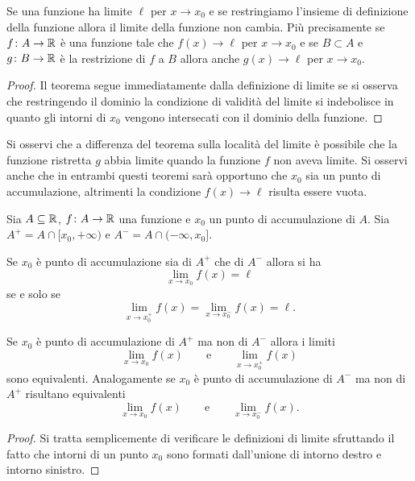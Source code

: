 \begin{theorem}
Se una funzione ha limite $\ell$ per $x\to x_0$ 
e se restringiamo l'insieme di definizione della funzione 
allora il limite della funzione non cambia. 
Più precisamente
se $f\colon A \to \mathbb R$ è una funzione tale che $f(x)\to \ell$ per $x\to x_0$
e se $B \subset A$ e $g\colon B\to \mathbb R$ è la restrizione di $f$ 
a $B$ allora anche $g(x)\to \ell$ per $x\to x_0$. 
\end{theorem}
%
\begin{proof}
Il teorema segue immediatamente dalla definizione di limite se si osserva
che restringendo il dominio la condizione di validità del limite si indebolisce
in quanto gli intorni di $x_0$ vengono intersecati con il dominio della funzione.
\end{proof}

Si osservi che a differenza del teorema sulla località del limite è
possibile che la funzione ristretta $g$ abbia limite quando la funzione
$f$ non aveva limite.
Si osservi anche che in entrambi questi teoremi sarà opportuno 
che $x_0$ sia un punto di accumulazione, altrimenti la condizione $f(x)\to \ell$ 
risulta essere vuota.

\begin{theorem}%
\mymark{*}
Sia $A\subseteq \mathbb R$, $f\colon A \to \mathbb R$ una funzione e $x_0$ un punto di accumulazione
di $A$. Sia $A^+ = A \cap [x_0,+\infty)$ e $A^- = A \cap (-\infty, x_0]$.

Se $x_0$ è punto di accumulazione sia di $A^+$ che di $A^-$
allora si ha
\[
  \lim_{x\to x_0} f(x) = \ell
\]
se e solo se
\[
  \lim_{x\to x_0^+} f(x) = \lim_{x\to x_0^-} f(x) = \ell.
\]

Se $x_0$ è punto di accumulazione di $A^+$ ma non di $A^-$ allora
i limiti
\[
  \lim_{x\to x_0} f(x) \qquad \text{e}\qquad \lim_{x\to x_0^+} f(x)
\]
sono equivalenti. Analogamente se $x_0$ è punto di accumulazione
di $A^-$ ma non di $A^+$ risultano equivalenti
\[
  \lim_{x\to x_0} f(x) \qquad \text{e}\qquad \lim_{x\to x_0^-} f(x).
\]
\end{theorem}
%
\begin{proof}
Si tratta semplicemente di verificare le definizioni di limite sfruttando il fatto che intorni di un punto $x_0$ sono formati dall'unione di intorno destro e intorno sinistro.
\end{proof}


